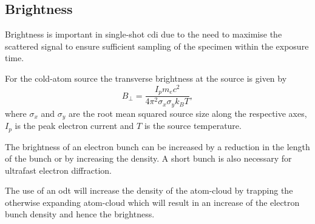 \subsection{Brightness}
Brightness is important in single-shot \gls{cdi} due to the need to maximise the scattered signal to ensure sufficient sampling of the specimen within the exposure time.

For the cold-atom source the transverse brightness at the source is given by\cite{reiser_theory_2008}
\begin{equation}
B_\perp = \frac{I_p m_e c^2}{4 \pi^2 \sigma_x \sigma_y k_B T},
\end{equation}
where $\sigma_x$ and $\sigma_y$ are the root mean squared source size along the respective axes, $I_p$ is the peak electron current and $T$ is the source temperature.

The brightness of an electron bunch can be increased by a reduction in the length of the bunch or by increasing the density. A short bunch is also necessary for ultrafast electron diffraction.

The use of an \gls{odt} will increase the density of the atom-cloud by trapping the otherwise expanding atom-cloud which will result in an increase of the electron bunch density and hence the brightness.
